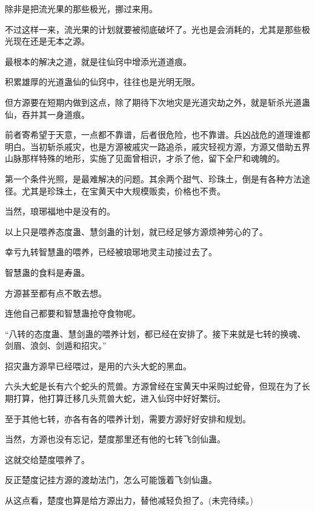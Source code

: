\begin{this_body}
除非是把流光果的那些极光，挪过来用。

不过这样一来，流光果的计划就要被彻底破坏了。光也是会消耗的，尤其是那些极光现在还是无本之源。

最根本的解决之道，就是往仙窍中增添光道道痕。

积累雄厚的光道蛊仙的仙窍中，往往也是光明无限。

但方源要在短期内做到这点，除了期待下次地灾是光道灾劫之外，就是斩杀光道蛊仙，吞并其一身道痕。

前者寄希望于天意，一点都不靠谱，后者很危险，也不靠谱。兵凶战危的道理谁都明白。当初斩杀戚灾，也是方源被戚灾一路追杀，戚灾轻视方源，方源又借助五界山脉那样特殊的地形，实施了见面曾相识，才杀了他，留下全尸和魂魄的。

第一个条件光照，是最难解决的问题。其余两个甜气、珍珠土，倒是有各种方法途径。尤其是珍珠土，在宝黄天中大规模贩卖，价格也不贵。

当然，琅琊福地中是没有的。

以上只是喂养态度蛊、慧剑蛊的计划，就已经足够方源烦神劳心的了。

幸亏九转智慧蛊的喂养，已经被琅琊地灵主动接过去了。

智慧蛊的食料是寿蛊。

方源甚至都有点不敢去想。

连他自己都要和智慧蛊抢夺食物呢。

“八转的态度蛊、慧剑蛊的喂养计划，都已经在安排了。接下来就是七转的换魂、剑眉、浪剑、剑遁和招灾。”

招灾蛊方源早已经喂过，是用的六头大蛇的黑血。

六头大蛇是长有六个蛇头的荒兽。方源曾经在宝黄天中采购过蛇骨，但现在为了长期打算，他打算迁移几头荒兽大蛇，进入仙窍中好好繁衍。

至于其他七转，亦各有各的喂养计划，需要方源好好安排和规划。

当然，方源也没有忘记，楚度那里还有他的七转飞剑仙蛊。

这就交给楚度喂养了。

反正楚度记挂方源的渡劫法门，怎么可能饿着飞剑仙蛊。

从这点看，楚度也算是给方源出力，替他减轻负担了。(未完待续。)

\end{this_body}

